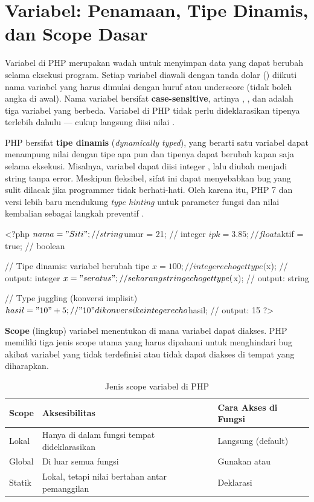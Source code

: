 ﻿\section{Variabel: Penamaan, Tipe Dinamis, dan Scope Dasar}

Variabel di PHP merupakan wadah untuk menyimpan data yang dapat berubah selama eksekusi program. Setiap variabel diawali dengan tanda dolar (\code{\$}) diikuti nama variabel yang harus dimulai dengan huruf atau underscore (tidak boleh angka di awal). Nama variabel bersifat \textbf{case-sensitive}, artinya , , dan  adalah tiga variabel yang berbeda. Variabel di PHP tidak perlu dideklarasikan tipenya terlebih dahulu --- cukup langsung diisi nilai \cite{phpManual}.

PHP bersifat \textbf{tipe dinamis} (\textit{dynamically typed}), yang berarti satu variabel dapat menampung nilai dengan tipe apa pun dan tipenya dapat berubah kapan saja selama eksekusi. Misalnya, variabel  dapat diisi integer , lalu diubah menjadi string  tanpa error. Meskipun fleksibel, sifat ini dapat menyebabkan bug yang sulit dilacak jika programmer tidak berhati-hati. Oleh karena itu, PHP 7 dan versi lebih baru mendukung \textit{type hinting} untuk parameter fungsi dan nilai kembalian sebagai langkah preventif \cite{phpRightWay}.

\begin{webcode}[language=PHP, caption={Variabel, tipe dinamis, dan type juggling}]
<?php
$nama = "Siti";        // string
$umur = 21;             // integer
$ipk = 3.85;            // float
$aktif = true;          // boolean

// Tipe dinamis: variabel berubah tipe
$x = 100;              // integer
echo gettype($x);      // output: integer
$x = "seratus";        // sekarang string
echo gettype($x);      // output: string

// Type juggling (konversi implisit)
$hasil = "10" + 5;     // "10" dikonversi ke integer
echo $hasil;            // output: 15
?>
\end{webcode}

\textbf{Scope} (lingkup) variabel menentukan di mana variabel dapat diakses. PHP memiliki tiga jenis scope utama yang harus dipahami untuk menghindari bug akibat variabel yang tidak terdefinisi atau tidak dapat diakses di tempat yang diharapkan.

\begin{table}[H]
\centering
\begin{tabular}{|P{2.5cm}|P{4cm}|P{5.5cm}|}
\hline
\textbf{Scope} & \textbf{Aksesibilitas} & \textbf{Cara Akses di Fungsi} \\
\hline
Lokal & Hanya di dalam fungsi tempat dideklarasikan & Langsung (default) \\
\hline
Global & Di luar semua fungsi & Gunakan  atau  \\
\hline
Statik & Lokal, tetapi nilai bertahan antar pemanggilan & Deklarasi  \\
\hline
\end{tabular}
\caption{Jenis scope variabel di PHP}
\end{table}

